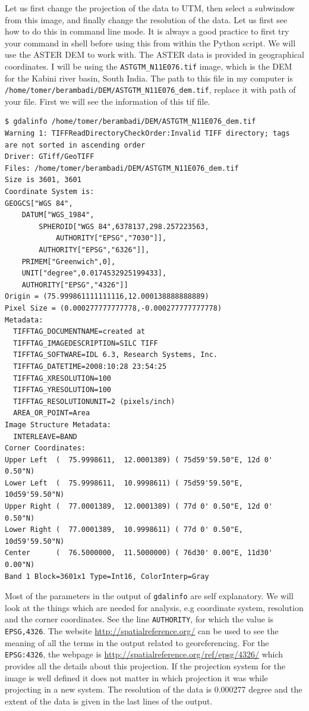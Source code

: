 \documentclass[10pt]{book}
\begin{document}
Let us first change the projection of the data to UTM, then select a subwindow from this image, and finally change the resolution of the data. Let us first see how to do this in command line mode. It is always a good practice to first try your command in shell before using this from within the Python script. We will use the ASTER DEM to work with. The ASTER data is provided in geographical coordinates. I will be using the \verb"ASTGTM_N11E076.tif" image, which is the DEM for the Kabini river basin, South India. The path to this file in my computer is \verb"/home/tomer/berambadi/DEM/ASTGTM_N11E076_dem.tif", replace it with path of your file. First we will see the information of this tif file.
\beforeverb \begin{verbatim}
$ gdalinfo /home/tomer/berambadi/DEM/ASTGTM_N11E076_dem.tif
Warning 1: TIFFReadDirectoryCheckOrder:Invalid TIFF directory; tags are not sorted in ascending order
Driver: GTiff/GeoTIFF
Files: /home/tomer/berambadi/DEM/ASTGTM_N11E076_dem.tif
Size is 3601, 3601
Coordinate System is:
GEOGCS["WGS 84",
    DATUM["WGS_1984",
        SPHEROID["WGS 84",6378137,298.257223563,
            AUTHORITY["EPSG","7030"]],
        AUTHORITY["EPSG","6326"]],
    PRIMEM["Greenwich",0],
    UNIT["degree",0.0174532925199433],
    AUTHORITY["EPSG","4326"]]
Origin = (75.999861111111116,12.000138888888889)
Pixel Size = (0.000277777777778,-0.000277777777778)
Metadata:
  TIFFTAG_DOCUMENTNAME=created at
  TIFFTAG_IMAGEDESCRIPTION=SILC TIFF
  TIFFTAG_SOFTWARE=IDL 6.3, Research Systems, Inc.
  TIFFTAG_DATETIME=2008:10:28 23:54:25
  TIFFTAG_XRESOLUTION=100
  TIFFTAG_YRESOLUTION=100
  TIFFTAG_RESOLUTIONUNIT=2 (pixels/inch)
  AREA_OR_POINT=Area
Image Structure Metadata:
  INTERLEAVE=BAND
Corner Coordinates:
Upper Left  (  75.9998611,  12.0001389) ( 75d59'59.50"E, 12d 0' 0.50"N)
Lower Left  (  75.9998611,  10.9998611) ( 75d59'59.50"E, 10d59'59.50"N)
Upper Right (  77.0001389,  12.0001389) ( 77d 0' 0.50"E, 12d 0' 0.50"N)
Lower Right (  77.0001389,  10.9998611) ( 77d 0' 0.50"E, 10d59'59.50"N)
Center      (  76.5000000,  11.5000000) ( 76d30' 0.00"E, 11d30' 0.00"N)
Band 1 Block=3601x1 Type=Int16, ColorInterp=Gray
\end{verbatim} \afterverb
Most of the parameters in the output of \verb"gdalinfo" are self explanatory. We will look at the things which are needed for analysis, e.g coordinate system, resolution and the corner coordinates. See the line \verb"AUTHORITY", for which the value is \verb"EPSG,4326". The website \url{http://spatialreference.org/} can be used to see the meaning of all the terms in the output related to georeferencing. For the \verb"EPSG:4326", the webpage is \url{http://spatialreference.org/ref/epsg/4326/} which provides all the details about this projection. If the projection system for the image is well defined it does not matter in which projection it was while projecting in a new system. The resolution of the data is 0.000277 degree and the extent of the data is given in the last lines of the output. \\
\end{document}

